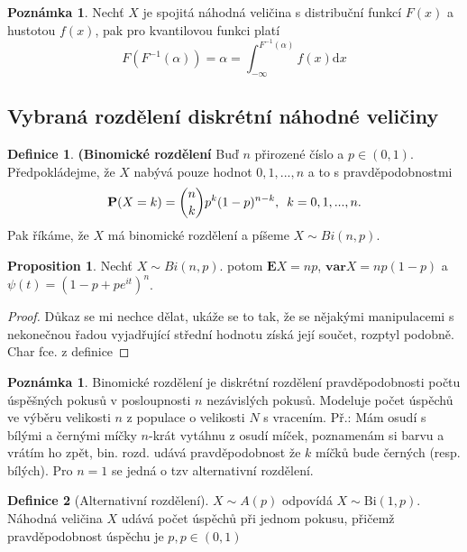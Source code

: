\documentclass[a4]{report}
\theoremstyle{definition}
\newtheorem{definition}{Definice}[section]
\newtheorem{notes}{Poznámka}[section]
\newtheorem{remark}{Poznámka}[section]
\newtheorem{proposition}{Proposition}[section]
\begin{document}
{\begin{notes}
Nechť $X$ je spojitá náhodná veličina s distribuční funkcí $F(x)$ a hustotou $f(x)$, pak pro kvantilovou funkci platí\begin{equation}
F(F^{-1}(\alpha))=\alpha=\int_{-\infty}^{F^{-1}(\alpha)}f(x)\mathrm{d}x
\end{equation}
\end{notes}

\subsection{Vybraná rozdělení diskrétní náhodné veličiny}
\begin{definition}{\textbf{(Binomické rozdělení}}
Buď $n$ přirozené číslo a $p \in (0, 1)$. Předpokládejme, že $X$ nabývá pouze hodnot $0, 1, ..., n$ a to s pravděpodobnostmi
\begin{equation}
\textbf{P}(X = k) = \binom{n}{k}p^{k}(1-p)^{n-k}, \enskip k = 0, 1, ..., n.
\end{equation}
Pak říkáme, že $X$ má binomické rozdělení a píšeme $X \sim Bi(n,p)$.
\end{definition}
\begin{proposition}
Nechť  $X \sim Bi(n,p)$. potom $\mathbf{E}X = np$, $\mathbf{var}X = np(1-p)$ a $\psi(t) = (1-p + pe^{it})^{n}$.
\end{proposition}
\begin{proof}
Důkaz se mi nechce dělat, ukáže se to tak, že se nějakými manipulacemi s nekonečnou řadou vyjadřující střední hodnotu získá její součet, rozptyl podobně. Char fce. z definice
\end{proof}

\begin{remark}
Binomické rozdělení je diskrétní rozdělení pravděpodobnosti počtu úspěšných pokusů v posloupnosti $n$ nezávislých pokusů.
Modeluje počet úspěchů ve výběru velikosti $n$ z populace o velikosti $N$ s vracením. Př.: Mám osudí s bílými a černými míčky $n$-krát vytáhnu z osudí míček, poznamenám si barvu a vrátím ho zpět, bin. rozd. udává pravděpodobnost že $k$ míčků bude černých (resp. bílých). Pro $n = 1$ se jedná o tzv alternativní rozdělení.
\end{remark}
\begin{definition}[Alternativní rozdělení]
$X \sim A(p)$ odpovídá $X\sim \mathrm{Bi}(1,p)$. Náhodná veličina $X$ udává počet úspěchů při jednom pokusu, přičemž pravděpodobnost úspěchu je $p, p\in (0,1)$
\end{definition}

}
\end{document}
